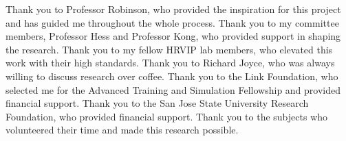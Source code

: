 \begin{frontmatter}
\maketitle





\tableofcontents
\listoffigures
\listoftables

    \newpage
    \begin{inlineabstract}
		\myabstract
    \end{inlineabstract}

\begin{acknowledgments}
    Thank you to Professor Robinson, who provided the inspiration for this project and has guided me throughout the whole process.
    Thank you to my committee members, Professor Hess and Professor Kong, who provided support in shaping the research.
    Thank you to my fellow HRVIP lab members, who elevated this work with their high standards.
    Thank you to Richard Joyce, who was always willing to discuss research over coffee.
    Thank you to the Link Foundation, who selected me for the Advanced Training and Simulation Fellowship and provided financial support.
    Thank you to the San Jose State University Research Foundation, who provided financial support.
    Thank you to the subjects who volunteered their time and made this research possible.
\end{acknowledgments}

% 


\end{frontmatter}
